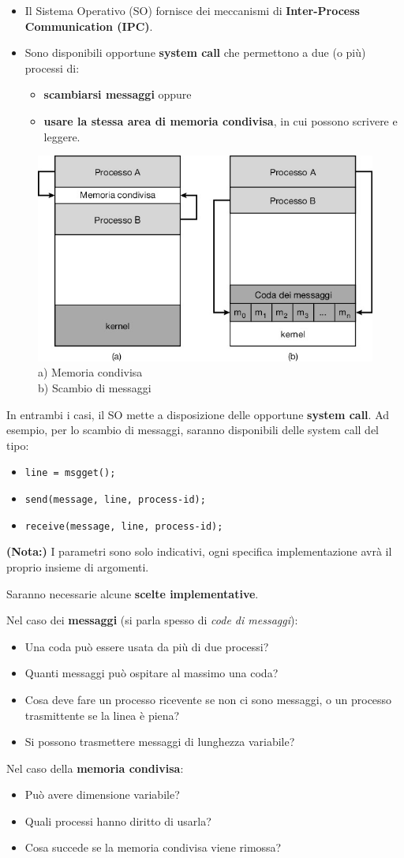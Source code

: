 \begin{itemize}
    \item Il Sistema Operativo (SO) fornisce dei meccanismi di \textbf{Inter-Process Communication (IPC)}.
    \item Sono disponibili opportune \textbf{system call} che permettono a due (o più) processi di:
    \begin{itemize}
        \item \textbf{scambiarsi messaggi} oppure
        \item \textbf{usare la stessa area di memoria condivisa}, in cui possono scrivere e leggere.
    \end{itemize}
\end{itemize}
\begin{figure}[h]
    \centering
    \includegraphics[width=0.5\linewidth]{images/IPC_graphic.png}
    \caption{a) Memoria condivisa\\b) Scambio di messaggi}
\end{figure}

In entrambi i casi, il SO mette a disposizione delle opportune \textbf{system call}. Ad esempio, per lo scambio di messaggi, saranno disponibili delle system call del tipo:

\begin{itemize}
    \item \texttt{line = msgget();}
    \item \texttt{send(message, line, process-id);}
    \item \texttt{receive(message, line, process-id);}
\end{itemize}

\textbf{(Nota:)} I parametri sono solo indicativi, ogni specifica implementazione avrà il proprio insieme di argomenti.

\bigskip
Saranno necessarie alcune \textbf{scelte implementative}. 

Nel caso dei \textbf{messaggi} (si parla spesso di \emph{code di messaggi}):
\begin{itemize}
    \item Una coda può essere usata da più di due processi?
    \item Quanti messaggi può ospitare al massimo una coda?
    \item Cosa deve fare un processo ricevente se non ci sono messaggi, o un processo trasmittente se la linea è piena?
    \item Si possono trasmettere messaggi di lunghezza variabile?
\end{itemize}

Nel caso della \textbf{memoria condivisa}:
\begin{itemize}
    \item Può avere dimensione variabile?
    \item Quali processi hanno diritto di usarla?
    \item Cosa succede se la memoria condivisa viene rimossa?
\end{itemize}

